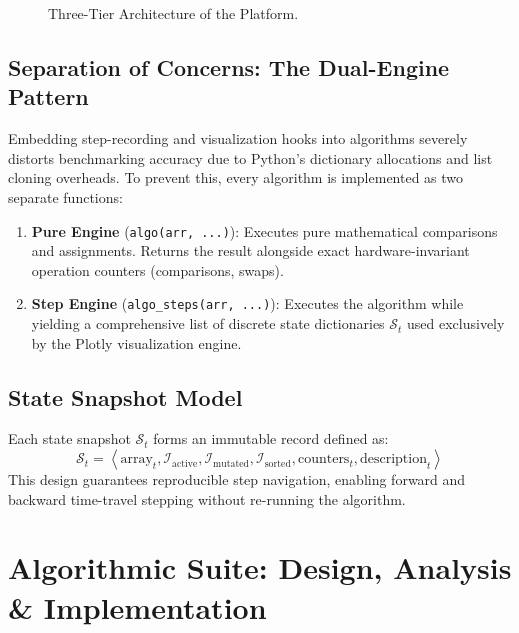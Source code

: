 \documentclass[11pt,a4paper]{article}
\theoremstyle{definition}
\theoremstyle{plain}
\theoremstyle{remark}
\begin{document}
\begin{figure}[htbp]
\caption{Three-Tier Architecture of the Platform.}
\label{fig:arch}
\end{figure}

\subsection{Separation of Concerns: The Dual-Engine Pattern}
Embedding step-recording and visualization hooks into algorithms severely distorts benchmarking accuracy due to Python's dictionary allocations and list cloning overheads. To prevent this, every algorithm is implemented as two separate functions:
\begin{enumerate}
    \item \textbf{Pure Engine} (\texttt{algo(arr, ...)}): Executes pure mathematical comparisons and assignments. Returns the result alongside exact hardware-invariant operation counters (comparisons, swaps).
    \item \textbf{Step Engine} (\texttt{algo\_steps(arr, ...)}): Executes the algorithm while yielding a comprehensive list of discrete state dictionaries $\mathcal{S}_t$ used exclusively by the Plotly visualization engine.
\end{enumerate}

\subsection{State Snapshot Model}
Each state snapshot $\mathcal{S}_t$ forms an immutable record defined as:
\begin{equation}
\mathcal{S}_t = \left\langle \text{array}_t, \mathcal{I}_{\text{active}}, \mathcal{I}_{\text{mutated}}, \mathcal{I}_{\text{sorted}}, \text{counters}_t, \text{description}_t \right\rangle
\end{equation}
This design guarantees reproducible step navigation, enabling forward and backward time-travel stepping without re-running the algorithm.

\section{Algorithmic Suite: Design, Analysis \& Implementation}
\end{document}

